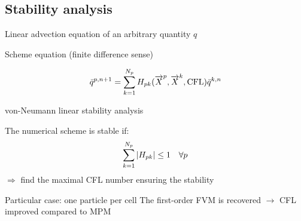 \subsection{Stability analysis}
\begin{frame}{Linear advection equation of an arbitrary quantity $q$}%
  \begin{block}{Scheme equation (finite difference sense)}
    \begin{footnotesize}
      \begin{equation*}
        \bar{q}^{p,n+1}=\sum_{k=1}^{N_p}H_{pk}({\overrightarrow{X}}^p,{\overrightarrow{X}}^k,\text{CFL})\bar{q}^{k,n}
      \end{equation*}
    \end{footnotesize}
  \end{block}
  \begin{block}{von-Neumann linear stability analysis}
    \begin{footnotesize}
      The numerical scheme is stable if:
      \begin{equation*}
        \sum_{k=1}^{N_p}\left\vert H_{pk}\right\vert \leq 1 \quad \forall p
      \end{equation*}
      \alert{$\Rightarrow$ find the maximal CFL number ensuring the stability}
    \end{footnotesize}
  \end{block}\pause
  \begin{footnotesize}
    \begin{block}{Particular case: one particle per cell}
      The first-order FVM is recovered $\rightarrow$ CFL improved compared to MPM 
    \end{block}
  \end{footnotesize}
\end{frame}

